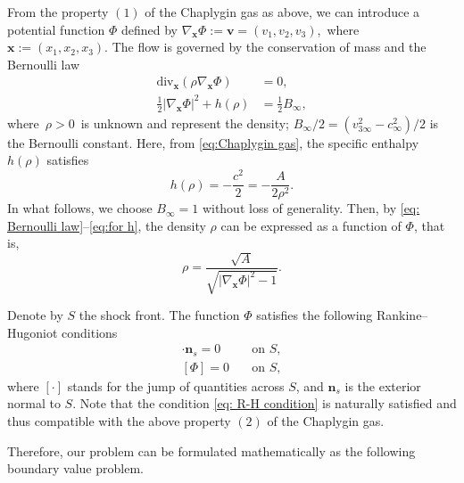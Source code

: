 \documentclass[reqno,12pt]{amsart}
\numberwithin{equation}{section}
\begin{document}
From the property $(1)$ of the Chaplygin gas as above, we can introduce a potential function \mbox{$\Phi$} defined by \mbox{$\nabla_{\bm{x}}\Phi:=\bm{v}=(v_1,v_2,v_3)$, where $\bm{x}:=(x_1,x_2,x_3)$}. The flow is governed by the conservation of mass and the Bernoulli law
\begin{align}
	\mathrm{div}_{\bm{x}}(\rho \nabla_{\bm{x}}\Phi)&=0,\label{eq: conservation of mass}\\
	\frac{1}{2}|\nabla_{\bm{x}}\Phi|^{2}+h(\rho)&=\frac12B_{\infty},\label{eq: Bernoulli law}
\end{align}
where~$\rho>0$~is unknown and represent the density; $B_{\infty}/2=(v_{3\infty}^2-c_{\infty}^2)/2$ is the Bernoulli constant. Here, from \eqref{eq:Chaplygin gas}, the specific enthalpy $h(\rho)$ satisfies
\begin{equation}\label{eq:for h}
	h(\rho)=-\frac{c^2}{2}=-\frac{A}{2\rho^2}.
\end{equation}
In what follows, we choose $B_{\infty}=1$ without loss of generality. Then, by \eqref{eq: Bernoulli law}--\eqref{eq:for h}, the density $\rho$ can be expressed as a function of $\Phi$, that is,
\begin{equation}\label{eq:2.29}
	\rho=\frac{\sqrt{A}}{\sqrt{|\nabla_{\bm{x}}\Phi|^{2}-1}}.
\end{equation}

Denote by $S$ the shock front. The function $\Phi$ satisfies the following Rankine--Hugoniot conditions
	\begin{align}
		[\rho \nabla_{\bm{x}}\Phi]\cdot\bm{n}_{s}=0\quad &\text{on $S$},\label{eq: R-H condition}\\	
            [\Phi]=0\quad &\text{on $S$},\label{eq: contious of phi}
	\end{align}
where $[\cdot]$ stands for the jump of quantities across $S$, and $\bm{n}_{s}$ is the exterior normal to $S$. Note that the condition \mbox{\eqref{eq: R-H condition}} is naturally satisfied and thus compatible with the above property \mbox{$(2)$} of the Chaplygin gas.

Therefore, our problem can be formulated mathematically as the following boundary value problem.
\end{document}
